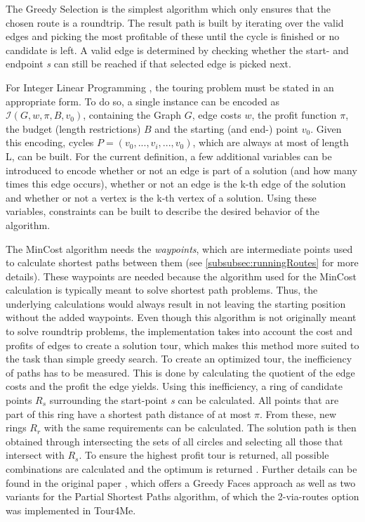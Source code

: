 The Greedy Selection \cite{buchin_tour4me_2022, wayahdi_greedy_2021} is the simplest algorithm which only ensures that the chosen route is a roundtrip.
The result path is built by iterating over the valid edges and picking the most profitable of these until the cycle is finished or no candidate is left.
A valid edge is determined by checking whether the start- and endpoint \textit{s} can still be reached if that selected edge is picked next.


For Integer Linear Programming \cite{buchin_tour4me_2022, graver_foundations_1975}, the touring problem must be stated in an appropriate form.
To do so, a single instance can be encoded as $\mathcal{I}(G, w, \pi, B, v_0)$, containing the Graph $G$, edge costs $w$, the profit function $\pi$, the budget (length restrictions) $B$ and the starting (and end-) point $v_0$.
Given this encoding, cycles $P=(v_0,...,v_i,...,v_0)$, which are always at most of length L, can be built.
For the current definition, a few additional variables can be introduced to encode whether or not an edge is part of a solution (and how many times this edge occurs), whether or not an edge is the k-th edge of the solution and whether or not a vertex is the k-th vertex of a solution. 
Using these variables, constraints can be built to describe the desired behavior of the algorithm.

The MinCost algorithm \cite{buchin_tour4me_2022, gemsa_efficient_2013} needs the \textit{waypoints}, which are intermediate points used to calculate shortest paths between them (see \ref{subsubsec:runningRoutes} for more details).
These waypoints are needed because the algorithm used for the MinCost calculation is typically meant to solve shortest path problems. 
Thus, the underlying calculations would always result in not leaving the starting position without the added waypoints. 
Even though this algorithm is not originally meant to solve roundtrip problems, the implementation takes into account the cost and profits of edges to create a solution tour, which makes this method more suited to the task than simple greedy search.
To create an optimized tour, the inefficiency of paths has to be measured. 
This is done by calculating the quotient of the edge costs and the profit the edge yields. 
Using this inefficiency, a ring of candidate points $R_s$ surrounding the start-point \textit{s} can be calculated.
All points that are part of this ring have a shortest path distance of at most $\pi$.
From these, new rings $R_r$ with the same requirements can be calculated. 
The solution path is then obtained through intersecting the sets of all circles and selecting all those that intersect with $R_s$.
To ensure the highest profit tour is returned, all possible combinations are calculated and the optimum is returned \cite{buchin_tour4me_2022}. 
Further details can be found in the original paper \cite{gemsa_efficient_2013}, which offers a Greedy Faces approach as well as two variants for the Partial Shortest Paths algorithm, of which the 2-via-routes option was implemented in Tour4Me.

